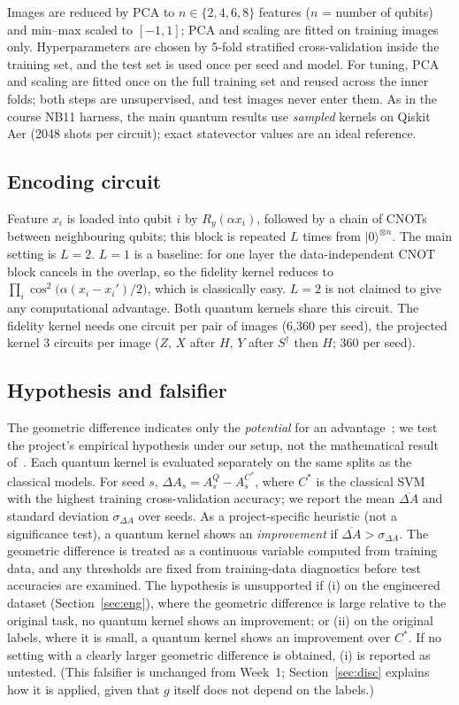 \documentclass[conference]{IEEEtran}
\begin{document}
Images are reduced by PCA to $n\in\{2,4,6,8\}$ features ($n$ = number of qubits) and min--max scaled to $[-1,1]$; PCA and scaling are fitted on training images only. Hyperparameters are chosen by 5-fold stratified cross-validation inside the training set, and the test set is used once per seed and model. For tuning, PCA and scaling are fitted once on the full training set and reused across the inner folds; both steps are unsupervised, and test images never enter them. As in the course NB11 harness, the main quantum results use \emph{sampled} kernels on Qiskit Aer (2048 shots per circuit); exact statevector values are an ideal reference.

\subsection{Encoding circuit}
Feature $x_i$ is loaded into qubit $i$ by $R_y(\alpha x_i)$, followed by a chain of CNOTs between neighbouring qubits; this block is repeated $L$ times from $|0\rangle^{\otimes n}$. The main setting is $L=2$. $L=1$ is a baseline: for one layer the data-independent CNOT block cancels in the overlap, so the fidelity kernel reduces to $\prod_i\cos^2\!\big(\alpha(x_i-x_i')/2\big)$, which is classically easy. $L=2$ is not claimed to give any computational advantage. Both quantum kernels share this circuit. The fidelity kernel needs one circuit per pair of images (6{,}360 per seed), the projected kernel 3 circuits per image ($Z$, $X$ after $H$, $Y$ after $S^\dagger$ then $H$; 360 per seed).

\subsection{Hypothesis and falsifier}
The geometric difference indicates only the \emph{potential} for an advantage~\cite{huang2021}; we test the project's empirical hypothesis under our setup, not the mathematical result of~\cite{huang2021}. Each quantum kernel is evaluated separately on the same splits as the classical models. For seed $s$, $\Delta A_s = A^{Q}_s - A^{C^\ast}_s$, where $C^\ast$ is the classical SVM with the highest training cross-validation accuracy; we report the mean $\overline{\Delta A}$ and standard deviation $\sigma_{\Delta A}$ over seeds. As a project-specific heuristic (not a significance test), a quantum kernel shows an \emph{improvement} if $\overline{\Delta A} > \sigma_{\Delta A}$. The geometric difference is treated as a continuous variable computed from training data, and any thresholds are fixed from training-data diagnostics before test accuracies are examined. The hypothesis is unsupported if (i) on the engineered dataset (Section~\ref{sec:eng}), where the geometric difference is large relative to the original task, no quantum kernel shows an improvement; or (ii) on the original labels, where it is small, a quantum kernel shows an improvement over $C^\ast$. If no setting with a clearly larger geometric difference is obtained, (i) is reported as untested. (This falsifier is unchanged from Week~1; Section~\ref{sec:disc} explains how it is applied, given that $g$ itself does not depend on the labels.)
\end{document}
